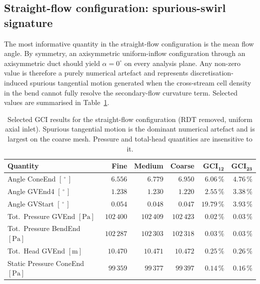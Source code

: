 \subsection{Straight-flow configuration: spurious-swirl signature}
\label{sec:gci_straight}

The most informative quantity in the straight-flow configuration is the mean flow angle. By symmetry, an axisymmetric uniform-inflow configuration through an axisymmetric duct should yield $\alpha = 0^\circ$ on every analysis plane. Any non-zero value is therefore a purely numerical artefact and represents discretisation-induced spurious tangential motion generated when the cross-stream cell density in the bend cannot fully resolve the secondary-flow curvature term. Selected values are summarised in Table~\ref{tab:gci_straight_keep}.

\begin{table}[h!]
  \centering
  \caption[GCI -- straight-flow configuration]{Selected GCI results for the straight-flow configuration (RDT removed, uniform axial inlet). Spurious tangential motion is the dominant numerical artefact and is largest on the coarse mesh. Pressure and total-head quantities are insensitive to it.}
  \label{tab:gci_straight_keep}
  \small
  \begin{tabular}{l r r r r r}
    \toprule
    \textbf{Quantity}                            & \textbf{Fine} & \textbf{Medium} & \textbf{Coarse} & $\mathbf{GCI_{12}}$ & $\mathbf{GCI_{23}}$ \\
    \midrule
    Angle ConeEnd  $[\,^\circ\,]$                & $6.556$       & $6.779$         & $6.950$         & $6.06\,\%$  & $4.76\,\%$  \\
    Angle GVEnd4   $[\,^\circ\,]$                & $1.238$       & $1.230$         & $1.220$         & $2.55\,\%$  & $3.38\,\%$  \\
    Angle GVStart  $[\,^\circ\,]$                & $0.054$       & $0.048$         & $0.047$         & $19.79\,\%$ & $3.93\,\%$  \\
    \midrule
    Tot.\ Pressure GVEnd     $[\mathrm{Pa}]$     & $102\,400$    & $102\,409$      & $102\,423$      & $0.02\,\%$  & $0.03\,\%$  \\
    Tot.\ Pressure BendEnd   $[\mathrm{Pa}]$     & $102\,287$    & $102\,303$      & $102\,318$      & $0.03\,\%$  & $0.03\,\%$  \\
    Tot.\ Head GVEnd $[\mathrm{m}]$              & $10.470$      & $10.471$        & $10.472$        & $0.25\,\%$  & $0.26\,\%$  \\
    Static Pressure ConeEnd $[\mathrm{Pa}]$      & $99\,359$     & $99\,377$       & $99\,397$       & $0.14\,\%$  & $0.16\,\%$  \\
    \bottomrule
  \end{tabular}
\end{table}

